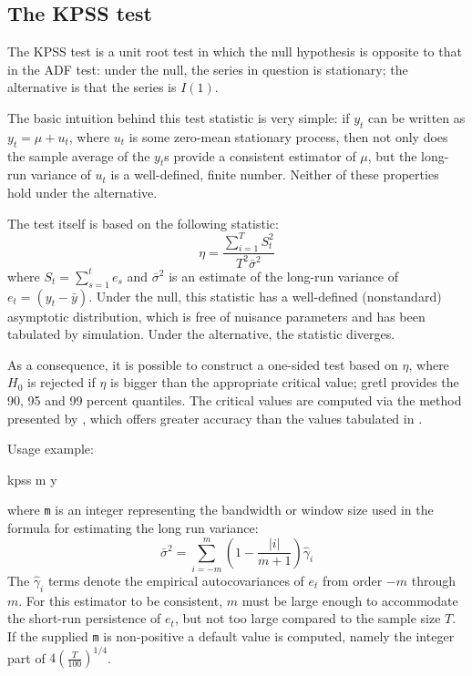\subsection{The KPSS test}
\label{sec:KPSStest}

The KPSS test \citep*{KPSS92} is a unit root test in which the null
hypothesis is opposite to that in the ADF test: under the null, the
series in question is stationary; the alternative is that the series
is $I(1)$.

The basic intuition behind this test statistic is very simple: if
$y_t$ can be written as $y_t = \mu + u_t$, where $u_t$ is some
zero-mean stationary process, then not only does the sample average of
the $y_t$s provide a consistent estimator of $\mu$, but the long-run
variance of $u_t$ is a well-defined, finite number. Neither of these
properties hold under the alternative.

The test itself is based on the following statistic:
\begin{equation}
  \label{eq:KPSStest}
  \eta = \frac{\sum_{i=1}^T S_t^2 }{ T^2 \bar{\sigma}^2 }
\end{equation}
where $S_t = \sum_{s=1}^t e_s$ and $\bar{\sigma}^2$ is an estimate of
the long-run variance of $e_t = (y_t - \bar{y})$. Under the null, this
statistic has a well-defined (nonstandard) asymptotic distribution,
which is free of nuisance parameters and has been tabulated by
simulation. Under the alternative, the statistic diverges.

As a consequence, it is possible to construct a one-sided test based
on $\eta$, where $H_0$ is rejected if $\eta$ is bigger than the
appropriate critical value; gretl provides the 90, 95 and 99
percent quantiles. The critical values are computed via the method
presented by \cite{sephton95}, which offers greater accuracy than the
values tabulated in \cite{KPSS92}.

Usage example:
\begin{code}
kpss m y
\end{code}
where \verb|m| is an integer representing the bandwidth or window
size used in the formula for estimating the long run variance:
\[
  \bar{\sigma}^2 = \sum_{i=-m}^m \left( 1 - \frac{|i|}{m+1} \right) \hat{\gamma}_i
\]
The $\hat{\gamma}_i$ terms denote the empirical autocovariances of
$e_t$ from order $-m$ through $m$.  For this estimator to be
consistent, $m$ must be large enough to accommodate the short-run
persistence of $e_t$, but not too large compared to the sample size
$T$.  If the supplied \verb|m| is non-positive a default value is
computed, namely the integer part of $4 \left( \frac{T}{100}
\right)^{1/4}$.

